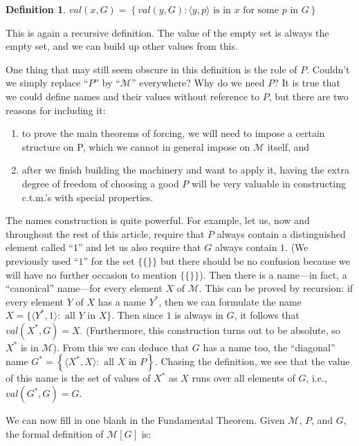 \documentclass[10pt]{article}
\theoremstyle{definition}
\newtheorem*{defn}{Definition}
\begin{document}
\begin{defn}
$val(x,G) =\left\{val(y,G) : \langle y,p\rangle\text{ is in }x\text{ for some }p\text{ in }G\right\}$
\end{defn}

This is again a recursive definition. The value of the empty set is always the empty set, and we can build up other values from this.

One thing that may still seem obscure in this definition is the role of $P$. Couldn't we simply replace ``$P$'' by ``$\mathcal M$'' everywhere? Why do we need $P$? It is true that we could define names and their values without reference to $P$, but there are two reasons for including it:

\begin{enumerate}
\item to prove the main theorems of forcing, we will need to impose a certain structure on P, which we cannot in general impose on $\mathcal M$ itself, and
\item after we finish building the machinery and want to apply it, having the extra degree of freedom of choosing a good $P$ will be very valuable in constructing c.t.m.'s with special properties.
\end{enumerate}

The names construction is quite powerful. For example, let us, now and throughout the rest of this article, require that $P$ always contain a distinguished element called ``$1$'' and let us also require that $G$ always contain $1$. (We previously used ``$1$'' for the set $\{\{\}\}$ but there should be no confusion because we will have no further occasion to mention $\{\{\}\}$). Then there is a name---in fact, a ``canonical'' name---for every element $X$ of $\mathcal M$. This can be proved by recursion: if every element $Y$ of $X$ has a name $Y^*$, then we can formulate the name $X = \{\langle Y^*,1\rangle :\text{ all }Y\text{ in }X\}$. Then since $1$ is always in $G$, it follows that $val(X^*,G) = X$. (Furthermore, this construction turns out to be absolute, so $X^*$ is in $\mathcal M$). From this we can deduce that $G$ has a name too, the ``diagonal'' name $G^* = \left\{\langle X^*,X\rangle :\text{ all }X\text{ in }P\right\}$. Chasing the definition, we see that the value of this name is the set of values of $X^*$ as $X$ runs over all elements of $G$, i.e., $val(G^*,G) = G$.

We can now fill in one blank in the Fundamental Theorem. Given $\mathcal M$, $P$, and $G$, the formal definition of $\mathcal M[G]$ is: 
\end{document}
